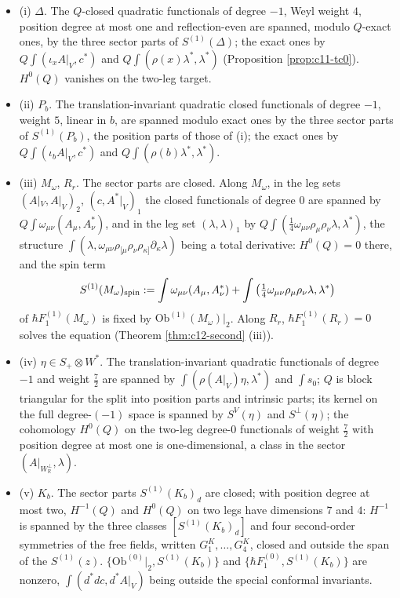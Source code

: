 \begin{proposition}
\label{prop:c12-two}
\begin{itemize}
\item (i) $\Delta$. The $Q$-closed quadratic functionals of degree $-1$, Weyl weight $4$, position degree at most one and reflection-even are spanned, modulo $Q$-exact ones, by the three sector parts of $S^{(1)}(\Delta)$; the exact ones by $Q\int(\iota_xA|_V,c^*)$ and $Q\int(\rho(x)\lambda^*,\lambda^*)$ (Proposition \ref{prop:c11-tc0}). $H^0(Q)$ vanishes on the two-leg target.
\item (ii) $P_b$. The translation-invariant quadratic closed functionals of degree $-1$, weight $5$, linear in $b$, are spanned modulo exact ones by the three sector parts of $S^{(1)}(P_b)$, the position parts of those of (i); the exact ones by $Q\int(\iota_bA|_V,c^*)$ and $Q\int(\rho(b)\lambda^*,\lambda^*)$.
\item (iii) $M_\omega$, $R_r$. The sector parts are closed. Along $M_\omega$, in the leg sets $(A|_V,A|_V)_2$, $(c,A^*|_V)_1$ the closed functionals of degree $0$ are spanned by $Q\int\omega_{\mu\nu}(A_\mu,A^*_\nu)$, and in the leg set $(\lambda,\lambda)_1$ by $Q\int(\tfrac14\omega_{\mu\nu}\rho_\mu\rho_\nu\lambda,\lambda^*)$, the structure $\int(\lambda,\omega_{\mu\nu}\rho_{[\mu}\rho_\nu\rho_{\kappa]}\partial_\kappa\lambda)$ being a total derivative: $H^0(Q)=0$ there, and the spin term
\[
S^{(1)}(M_\omega)_{\rm spin}:=\int\omega_{\mu\nu}(A_\mu,A^*_\nu)+\int\big(\tfrac14\omega_{\mu\nu}\rho_\mu\rho_\nu\lambda,\lambda^*\big)
\]
of $\hbar F_1^{(1)}(M_\omega)$ is fixed by $\mathrm{Ob}^{(1)}(M_\omega)|_2$. Along $R_r$, $\hbar F_1^{(1)}(R_r)=0$ solves the equation (Theorem \ref{thm:c12-second} (iii)).
\item (iv) $\eta\in S_+\otimes W^*$. The translation-invariant quadratic functionals of degree $-1$ and weight $\tfrac72$ are spanned by $\int(\rho(A|_V)\eta,\lambda^*)$ and $\int s_0$; $Q$ is block triangular for the split into position parts and intrinsic parts; its kernel on the full degree-$(-1)$ space is spanned by $S^V(\eta)$ and $S^\perp(\eta)$; the cohomology $H^0(Q)$ on the two-leg degree-$0$ functionals of weight $\tfrac72$ with position degree at most one is one-dimensional, a class in the sector $(A|_{W_{\mathbb R}^\perp},\lambda)$.
\item (v) $K_b$. The sector parts $S^{(1)}(K_b)_d$ are closed; with position degree at most two, $H^{-1}(Q)$ and $H^0(Q)$ on two legs have dimensions $7$ and $4$: $H^{-1}$ is spanned by the three classes $[S^{(1)}(K_b)_d]$ and four second-order symmetries of the free fields, written $G^K_1,\dots,G^K_4$, closed and outside the span of the $S^{(1)}(z)$. $\{\mathrm{Ob}^{(0)}|_2,S^{(1)}(K_b)\}$ and $\{\hbar F_1^{(0)},S^{(1)}(K_b)\}$ are nonzero, $\int(d^*dc,d^*A|_V)$ being outside the special conformal invariants.
\end{itemize}
\end{proposition}

